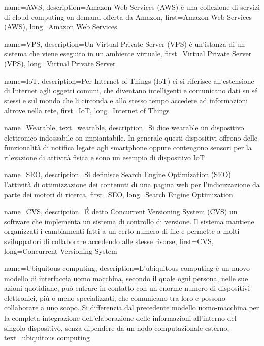 {
    name={AWS},
    description={Amazon Web Services (AWS) è una collezione di servizi di cloud computing on-demand offerta da Amazon},
    first={Amazon Web Services (AWS)},
    long={Amazon Web Services}
}

{
    name={VPS},
    description={Un Virtual Private Server (VPS) è un'istanza di un sistema che viene eseguito in un ambiente virtuale},
    first={Virtual Private Server (VPS)},
    long={Virtual Private Server}
}

{
    name={IoT},
    description={Per Internet of Things (IoT) ci si riferisce all'estensione di Internet agli oggetti comuni, che diventano intelligenti e comunicano dati su sé stessi e sul mondo che li circonda e allo stesso tempo accedere ad informazioni altrove nella rete},
    first={IoT},
    long={Internet of Things}
}

{
    name={Wearable},
    text={wearable},
    description={Si dice wearable un dispositivo elettronico indossabile on impiantabile. In generale questi dispositivi offrono delle funzionalità di notifica legate agli smartphone oppure contengono sensori per la rilevazione di attività fisica e sono un esempio di dispositivo \gls{IoT}}
}

{
    name={SEO},
    description={Si definisce Search Engine Optimization (SEO) l'attività di ottimizzazione dei contenuti di una pagina web per l'indicizzazione da parte dei motori di ricerca},
    first={SEO},
    long={Search Engine Optimization}
}

{
    name={CVS},
    description={É detto Concurrent Versioning System (CVS) un software che implementa un sistema di controllo di versione. Il sistema mantiene organizzati i cambiamenti fatti a un certo numero di file e permette a molti sviluppatori di collaborare accedendo alle stesse risorse},
    first={CVS},
    long={Concurrent Versioning System}
}

{
    name={Ubiquitous computing},
    description={L'ubiquitous computing è un nuovo modello di interfaccia uomo macchina, secondo il quale ogni persona, nelle sue azioni quotidiane, può entrare in contatto con un enorme numero di dispositivi elettronici, più o meno specializzati, che comunicano tra loro e possono collaborare a uno scopo. Si differenzia dal precedente modello uomo-macchina per la completa integrazione dell'elaborazione delle informazioni all'interno del singolo dispositivo, senza dipendere da un nodo computazionale esterno},
    text={ubiquitous computing}
}

